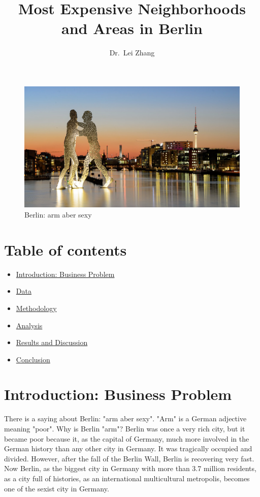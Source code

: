 \documentclass[11pt]{article}
\title{Most Expensive Neighborhoods and Areas in Berlin}
\author{Dr.~Lei Zhang}
\providecommand{\tightlist}{%
      \setlength{\itemsep}{0pt}\setlength{\parskip}{0pt}}
\begin{document}
    
    \maketitle
    



\begin{figure}
\centering
\includegraphics[scale=1.3]{../berlin.jpg}
\caption{Berlin: arm aber sexy}
\end{figure}

    \hypertarget{table-of-contents}{%
\section{Table of contents}\label{table-of-contents}}

\begin{itemize}
\tightlist
\item
  \hyperref[introduction]{Introduction: Business Problem}
\item
  \hyperref[data]{Data}
\item
  \hyperref[methodology]{Methodology}
\item
  \hyperref[analysis]{Analysis}
\item
  \hyperref[results]{Results and Discussion}
\item
  \hyperref[conclusion]{Conclusion}
\end{itemize}

    \hypertarget{introduction-business-problem}{%
\section{\texorpdfstring{Introduction: Business Problem
}{Introduction: Business Problem }}\label{introduction}}


There is a saying about Berlin: "arm aber sexy". "Arm" is a German adjective
meaning "poor". Why is Berlin "arm"? Berlin was once a very rich city, but
it became poor because it, as the capital of Germany, much more involved in
the German history than any other city in Germany. It was tragically
occupied and divided. However, after the fall of the Berlin Wall, Berlin is 
recovering very fast. Now Berlin,  as the biggest city in Germany with more
than 3.7 million residents, as a city full of histories, as an
international multicultural metropolis, becomes one of the sexist city in Germany.
\end{document}
